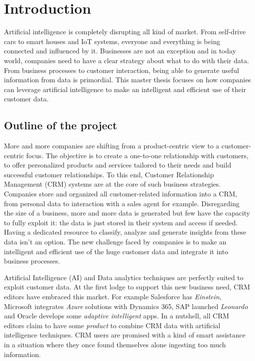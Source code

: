 \chapter{Introduction}

Artificial intelligence is completely disrupting all kind of market. From self-drive cars to smart houses and IoT systems, everyone and everything is being connected and influenced by it. Businesses are not an exception and in today world, companies need to have a clear strategy about what to do with their data. From business processes to customer interaction, being able to generate useful information from data is primordial. This master thesis focuses on how companies can leverage artificial intelligence to make an intelligent and efficient use of their customer data.


\section{Outline of the project}

More and more companies are shifting from a product-centric view to a customer-centric focus. The objective is to create a one-to-one relationship with customers, to offer personalized products and services tailored to their needs and build successful customer relationships. To this end, Customer Relationship Management (CRM) systems are at the core of such business strategies. Companies store and organized all customer-related information into a CRM, from personal data to interaction with a sales agent for example. Disregarding the size of a business, more and more data is generated but few have the capacity to fully exploit it: the data is just stored in their system and access if needed. Having a dedicated resource to classify, analyze and generate insights from these data isn't an option. The new challenge faced by companies is to make an intelligent and efficient use of the huge customer data and integrate it into business processes.

Artificial Intelligence (AI) and Data analytics techniques are perfectly suited to exploit customer data. At the first lodge to support this new business need, CRM editors have embraced this market. For example Salesforce has \textit{Einstein}, Microsoft integrates \textit{Azure} solutions with Dynamics 365, SAP launched \textit{Leonardo} and Oracle develops some \textit{adaptive intelligent} apps. In a nutshell, all CRM editors claim to have some \textit{product} to combine CRM data with artificial intelligence techniques. CRM users are promised with a kind of smart assistance in a situation where they once found themselves alone ingesting too much information. 

